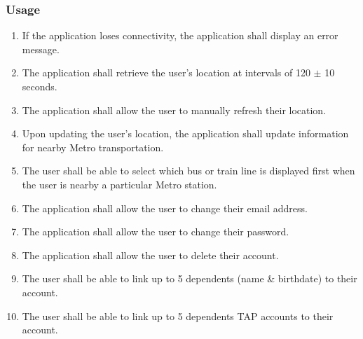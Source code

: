 	\subsubsection{Usage}\begin{enumerate}
		\item If the application loses connectivity, the application shall display an error message.
		\item The application shall retrieve the user’s location at intervals of 120 $\pm$ 10 seconds.
		\item The application shall allow the user to manually refresh their location.
		\item Upon updating the user’s location, the application shall update information for nearby Metro transportation.
		\item The user shall be able to select which bus or train line is displayed first when the user is nearby a particular Metro station.
		\item The application shall allow the user to change their email address.
		\item The application shall allow the user to change their password.
		\item The application shall allow the user to delete their account.
		\item The user shall be able to link up to 5 dependents (name \& birthdate) to their account.
		\item The user shall be able to link up to 5 dependents TAP accounts to their account.
	\end{enumerate}
	

